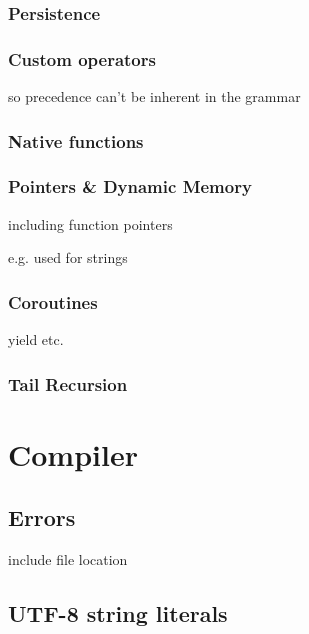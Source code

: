             \subsubsection{Persistence}
                
            \subsubsection{Custom operators}
                
                so precedence can't be inherent in the grammar
                
            \subsubsection{Native functions}
                
            \subsubsection{Pointers \& Dynamic Memory}
                
                including function pointers
                
                e.g. used for strings
                
            \subsubsection{Coroutines}
            	
            	yield etc.
            
            \subsubsection{Tail Recursion}
            
    
    \section{Compiler}
        
        \subsection{Errors}
            
            include file location
            
        \subsection{UTF-8 string literals}
            
